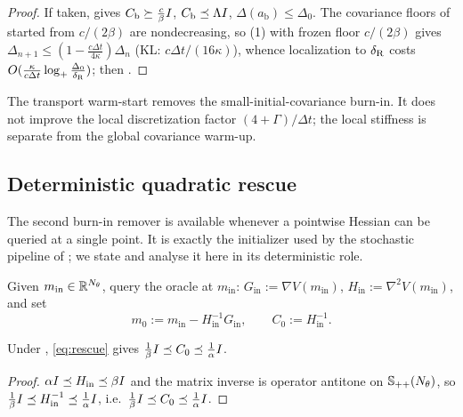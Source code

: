 \begin{proof}
If taken,  gives $C_{\mathrm b}\succeq\tfrac c\beta I$, $C_{\mathrm b}\preceq\Lambda I$,
$\Delta(a_{\mathrm b})\leq\Delta_0$. The covariance floors of  started
from $c/(2\beta)$ are nondecreasing, so (1) with frozen floor $c/(2\beta)$
gives $\Delta_{n+1}\leq(1-\tfrac{c\Delta t}{4\kappa})\Delta_n$ (KL: $c\Delta t/(16\kappa)$), whence
localization to $\delta_{\mathrm{R}}$ costs $O(\tfrac\kappa{c\Delta t}\log_+\tfrac{\Delta_0}{\delta_{\mathrm{R}}})$;
then .
\end{proof}

\begin{remark}
\label{rem:transport-caveat}
The transport warm-start removes the small-initial-covariance burn-in. It does not improve the
local discretization factor $(4+\Gamma)/\Delta t$; the local stiffness is separate from the global
covariance warm-up.
\end{remark}

\subsection{Deterministic quadratic rescue}
\label{subsec:rescue-det}

The second burn-in remover is available whenever a pointwise Hessian can be queried at a single
point. It is exactly the initializer used by the stochastic pipeline of ;
we state and analyse it here in its deterministic role.

\begin{definition}
\label{def:rescue}
Given $m_{\mathrm{in}}\in\mathbb{R}^{N_\theta}$, query the oracle at $m_{\mathrm{in}}$:
$G_{\mathrm{in}}:=\nabla V(m_{\mathrm{in}})$, $H_{\mathrm{in}}:=\nabla^2V(m_{\mathrm{in}})$, and set
\begin{equation}
\label{eq:rescue}
    \boxed{\;
    m_0:=m_{\mathrm{in}}-H_{\mathrm{in}}^{-1}G_{\mathrm{in}},
    \qquad
    C_0:=H_{\mathrm{in}}^{-1}.
    \;}
\end{equation}
\end{definition}

\begin{lemma}
\label{lem:rescue-band}
Under , \eqref{eq:rescue} gives $\tfrac1\beta I\preceq C_0\preceq\tfrac1\alpha I$.
\end{lemma}

\begin{proof}
$\alpha I\preceq H_{\mathrm{in}}\preceq\beta I$ and the matrix inverse is operator antitone on
$\mathbb{S}_{++}(N_\theta)$, so $\tfrac1\beta I\preceq H_{\mathrm{in}}^{-1}\preceq\tfrac1\alpha I$, i.e.\
$\tfrac1\beta I\preceq C_0\preceq\tfrac1\alpha I$.
\end{proof}


